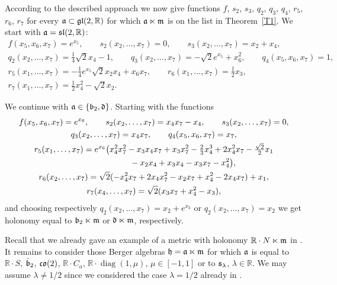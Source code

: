\documentclass[pdftex]{sigma}
\numberwithin{equation}{section}
\newcommand\fh{{\frak h}}
\newcommand\fm{{\frak m}}
\newcommand\fa{{\frak a}}
\newcommand\fb{{\frak b}}
\newcommand\fd{{\frak d}}
\newcommand\fs{{\frak s}}
\newcommand{\fgl}{\mathop{{\frak g \frak l}}}
\newcommand{\fsl}{\mathop{{\frak s \frak l}}}
\newcommand{\fco}{\mathop{{\frak c \frak o}}}
\newcommand\RR{{\mathbb R}}
\newcommand{\diag}{\operatorname{diag}}
\begin{document}
According to the described approach we now give functions $f$, $s_2$, $s_3$, $q_2$, $q_3$, $q_4$, $r_5$, $r_6$, $r_7$ for every $\fa\subset\fgl(2,\RR)$ for which $\fa\ltimes \fm$ is on the list in Theorem~\ref{T1}. We start with $\fa=\fsl(2,\RR)$:
\begin{gather*}
f(x_5,x_6,x_7) = e^{x_5},\qquad
s_2(x_2,\dots,x_7) = 0,\qquad
s_3(x_2,\dots,x_7) = x_2+x_4,\\
q_2(x_2,\dots,x_7) = \tfrac14 \sqrt2 x_4-1,\qquad
q_3(x_2,\dots,x_7) = -\sqrt2 e^{x_5}+x_6^2,\qquad
q_4(x_5,x_6,x_7) = 1,\\
r_5(x_1,\dots,x_7) = -\tfrac14 e^{x_5} \sqrt2 x_2x_4+x_6x_7,\qquad
r_6(x_1,\dots,x_7) = \tfrac12 x_3, \\
r_7(x_1,\dots,x_7) = \tfrac12 x_4^2- \sqrt2 x_2 .
\end{gather*}

We continue with $\fa\in \{\fb_2, \fd\}$. Starting with the functions
\begin{gather*}
f(x_5,x_6,x_7) = e^{x_6} ,\qquad
s_2(x_2,\dots, x_7) = x_4 x_7-x_4,\qquad
 s_3 (x_2, \dots, x_7) = 0,\\
q_3(x_2, \dots, x_7) = x_4 x_7,\qquad
q_4 (x_5,x_6,x_7) = x_7,\\
r_5(x_1,\dots, x_7) = e^{x_6} \big( x_4^2 x_7^2 - x_3 x_4 x_7 + x_3 x_7^2 - \tfrac23 x_4^3 + 2 x_4^2 x_7 - \tfrac { \sqrt{2}}2 x_1 \\
\hphantom{r_5(x_1,\dots, x_7) =}{} - x_2 x_4 + x_3 x_4 - x_3 x_7 - x_4^2\big),\\
r_6(x_2,\dots, x_7) = \sqrt{2} (-x_4^2 x_7 + 2 x_4 x_7^2 - x_2 x_7 + x_4^2 - 2 x_4 x_7) + x_1 ,\\
r_7(x_4,\dots, x_7) = \sqrt 2 (x_3 x_7 + x_4^2 - x_3),
\end{gather*}
and choosing respectively $q_2 (x_2, \dots, x_7) = x_2 + e^{x_3}$ or $q_2 (x_2, \dots, x_7) = x_2 $ we get holonomy equal to $\fb_2\ltimes \fm $ or $\fd\ltimes \fm$, respectively.

Recall that we already gave an example of a metric with holonomy $\RR\cdot N\ltimes \fm$ in \cite{FK}. It remains to consider those Berger algebras $\fh=\fa\ltimes \fm$ for which $\fa$ is equal to $\RR\cdot S$, $\hat \fb_2$, $\fco(2)$, $\RR\cdot C_a$, $\RR\cdot\diag(1,\mu)$, $\mu\in[-1,1]$ or to $\fs_\lambda$, $\lambda\in\RR$. We may assume $\lambda\not=1/2$ since we considered the case $\lambda=1/2$ already in \cite{FK}.
\end{document}

